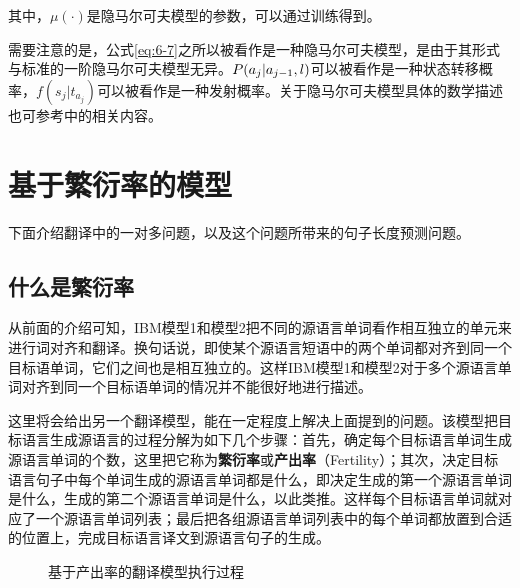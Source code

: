 \noindent 其中，$\mu( \cdot )$是隐马尔可夫模型的参数，可以通过训练得到。

\parinterval 需要注意的是，公式\eqref{eq:6-7}之所以被看作是一种隐马尔可夫模型，是由于其形式与标准的一阶隐马尔可夫模型无异。${P}(a_{j}|a_{j-1},l)$可以被看作是一种状态转移概率，$f(s_{j}|t_{a_j})$可以被看作是一种发射概率。关于隐马尔可夫模型具体的数学描述也可参考{\chapterthree}中的相关内容。


\sectionnewpage
\section{基于繁衍率的模型}

下面介绍翻译中的一对多问题，以及这个问题所带来的句子长度预测问题。


\subsection{什么是繁衍率}

\parinterval 从前面的介绍可知，IBM模型1和模型2把不同的源语言单词看作相互独立的单元来进行词对齐和翻译。换句话说，即使某个源语言短语中的两个单词都对齐到同一个目标语单词，它们之间也是相互独立的。这样IBM模型1和模型2对于多个源语言单词对齐到同一个目标语单词的情况并不能很好地进行描述。

\parinterval 这里将会给出另一个翻译模型，能在一定程度上解决上面提到的问题。该模型把目标语言生成源语言的过程分解为如下几个步骤：首先，确定每个目标语言单词生成源语言单词的个数，这里把它称为{\small\sffamily\bfseries{繁衍率}}或{\small\sffamily\bfseries{产出率}}（Fertility）；其次，决定目标语言句子中每个单词生成的源语言单词都是什么，即决定生成的第一个源语言单词是什么，生成的第二个源语言单词是什么，以此类推。这样每个目标语言单词就对应了一个源语言单词列表；最后把各组源语言单词列表中的每个单词都放置到合适的位置上，完成目标语言译文到源语言句子的生成。

\begin{figure}[htp]
    \centering

   \caption{基于产出率的翻译模型执行过程}
   \label{fig:6-5}
\end{figure}

